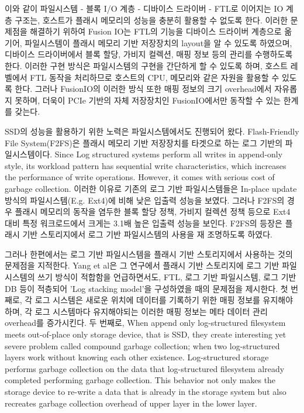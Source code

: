 \documentclass[letterpaper,twocolumn,10pt]{article}
\begin{document}
이와 같이 파일시스템 - 블록 I/O 계층 - 디바이스 드라이버 - FTL로 이어지는 IO 계층 구조는, 호스트가 플래시 메모리의 성능을 충분히 활용할 수 없도록 한다. 이러한 문제점을 해결하기 위하여 Fusion IO\cite{fusion_io}는 FTL의 기능을 디바이스 드라이버 계층으로 옮기어, 파일시스템이 플래시 메모리 기반 저장장치의 layout을 알 수 있도록 하였으며, 디바이스 드라이버에서 블록 할당, 가비지 컬렉션, 매핑 정보 등의 관리를 수행하도록 한다. 이러한 구현 방식은 파일시스템의 구현을 간단하게 할 수 있도록 하며, 호스트 레벨에서 FTL 동작을 처리하므로 호스트의 CPU, 메모리와 같은 자원을 활용할 수 있도록 한다. 그러나 FusionIO의 이러한 방식 또한 매핑 정보의 크기 overhead에서 자유롭지 못하며, 더욱이 PCIe 기반의 자체 저장장치인 FusionIO에서만 동작할 수 있는 한계를 갖는다.

SSD의 성능을 활용하기 위한 노력은 파일시스템에서도 진행되어 왔다. Flash-Friendly File System(F2FS\cite{lee2015f2fs})은 플래시 메모리 기반 저장장치를 타겟으로 하는 로그 기반의 파일시스템이다. Since Log structured systems\cite{rosenblum1992design} perform all writes in append-only style, its workload pattern has sequential write characteristics, which increases the performance of write operations. However, it comes with serious cost of garbage collection. 이러한 이유로 기존의 로그 기반 파일시스템들은 In-place update 방식의 파일시스템(E.g. Ext4\cite{cao2007ext4})에 비해 낮은 입출력 성능을 보였다\cite{jeong2013stack}. 그러나 F2FS의 경우 플래시 메모리의 동작을 염두한 블록 할당 정책, 가비지 컬렉션 정책 등으로 Ext4 대비 특정 워크로드에서 크게는 3.1배 높은 입출력 성능을 보인다\cite{lee2015f2fs}. F2FS의 등장은 플래시 기반 스토리지에서 로그 기반 파일시스템의 사용을 재 조명하도록 하였다.

그러나 한편에서는 로그 기반 파일시스템을 플래시 기반 스토리지에서 사용하는 것의 문제점을 지적한다. Yang et al\cite{yang2014don}은 그 연구에서 플래시 기반 스토리지에 로그 기반 파일시스템의 쓰기 방식이 적합함을 언급하면서도, FTL, 로그 기반 파일시스템, 로그 기반 DB 등이 적층되어 'Log stacking model'을 구성하였을 때의 문제점을 제시한다. 첫 번째로, 각 로그 시스템은 새로운 위치에 데이터를 기록하기 위한 매핑 정보를 유지해야 하며, 각 로그 시스템마다 유지해야되는 이러한 매핑 정보는 메타 데이터 관리 overhead를 증가시킨다. 두 번째로, When append only log-structured filesystem meets out-of-place only storage device, that is SSD, they create interesting yet severe problem called compound garbage collection; when two log-structured layers work without knowing each other existence. Log-structured storage performs garbage collection on the data that log-structured filesystem already completed performing garbage collection. This behavior not only makes the storage device to re-write a data that is already in the storage system but also recreates garbage collection overhead of upper layer in the lower layer.
\end{document}
